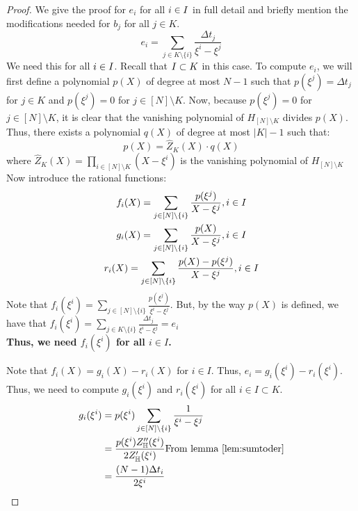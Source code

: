 \begin{proof}

    We give the proof for $e_i$ for all $i \in I$ in full detail and briefly mention the modifications needed for $b_j$ for all $j \in K$. \\

    \begin{equation}\label{eq:ei}
    e_i = \sum_{j\in K\setminus \{i\}} \frac{\Delta t_j}{\xi^i - \xi^j}
    \end{equation}
    We need this for all $i \in I$. Recall that $I \subset K$ in this case.
    To compute $e_i$, we will first define a polynomial $p(X)$ of degree at most $N-1$ such that
    $p(\xi^j)=\Delta t_j$ for $j\in K$ and $p(\xi^j)=0$ for $j \in [N]\setminus K$.
    Now, because $p(\xi^j)=0$ for $j \in [N]\setminus K$, it is clear that the vanishing polynomial of $H_{[N]\setminus K}$ divides $p(X)$.
    Thus, there exists a polynomial $q(X)$ of degree at most $|K|-1$ such that:
    \begin{equation}\label{eq:px}
    p(X) = \hat{Z}_K(X)\cdot q(X)
    \end{equation}
    where $\hat{Z}_K(X)=\prod_{i\in [N]\setminus K}(X-\xi^i)$ is the vanishing polynomial of $H_{[N]\setminus K}$\\

    Now introduce the rational functions:
    \begin{gather}\label{eq:fgr}
    f_i(X) = \sum_{j\in [N]\setminus \{i\}}\frac{p(\xi^j)}{X-\xi^j}, i\in I \\
    g_i(X) = \sum_{j\in [N]\setminus \{i\}}\frac{p(X)}{X-\xi^j}, i\in I \\
    r_i(X) = \sum_{j\in [N]\setminus \{i\}}\frac{p(X) - p(\xi^j)}{X-\xi^j}, i\in I
    \end{gather}
    Note that $f_i(\xi^i)=\sum_{j\in [N]\setminus \{i\}}\frac{p(\xi^j)}{\xi^i-\xi^j}$.
    But, by the way $p(X)$ is defined, we have that $f_i(\xi^i)=\sum_{j\in K\setminus \{i\}}\frac{\Delta t_j}{\xi^i-\xi^j}=e_i$\\
    \textbf{Thus, we need $f_i(\xi^i)$ for all $i \in I$.}

    Note that $f_i(X) = g_i(X) - r_i(X)$ for $i\in I$.
    Thus, $e_i=g_i(\xi^i)-r_i(\xi^i)$.
    Thus, we need to compute $g_i(\xi^i)$ and $r_i(\xi^i)$ for all $i \in I \subset K$.
    \begin{align*}
        g_i(\xi^i) &= p(\xi^i)\sum_{j\in [N]\setminus \{i\}} \frac{1}{\xi^i-\xi^j} \\
        &= \frac{p(\xi^i)Z_{\mathbb{H}}''(\xi^i)}{2 Z_{\mathbb{H}}'(\xi^i)} \text{From lemma \ref{lem:sumtoder}} \\
        &= \frac{(N-1)\Delta t_i}{2\xi^i}
    \end{align*}


\end{proof}
